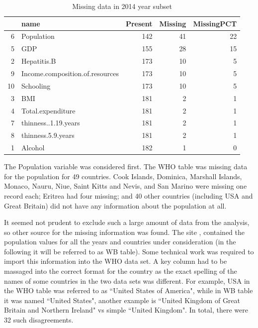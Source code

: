 \begin{table}[ht]
\centering
\begin{tabular}{rlrrr}
  \toprule
 & name & Present & Missing & MissingPCT \\ 
  \midrule
6 & Population & 142 &  41 &  22 \\ 
  5 & GDP & 155 &  28 &  15 \\ 
  2 & Hepatitis.B & 173 &  10 &   5 \\ 
  9 & Income.composition.of.resources & 173 &  10 &   5 \\ 
  10 & Schooling & 173 &  10 &   5 \\ 
  3 & BMI & 181 &   2 &   1 \\ 
  4 & Total.expenditure & 181 &   2 &   1 \\ 
  7 & thinness..1.19.years & 181 &   2 &   1 \\ 
  8 & thinness.5.9.years & 181 &   2 &   1 \\ 
  1 & Alcohol & 182 &   1 &   0 \\ 
   \bottomrule
\end{tabular}
\caption{Missing data in 2014 year subset}
\label{tab:missing}
\end{table}

The Population variable was considered first. The WHO table was missing data for the population for 49 countries. Cook Islands, Dominica, Marshall Islands, Monaco, Nauru, Niue, Saint Kitts and Nevis, and San Marino were missing one record each; Eritrea had four missing; and 40 other countries (including USA and Great Britain) did not have any information about the population at all.

It seemed not prudent to exclude such a large amount of data from the analysis, so other source for the missing information was found. The site \cite{WB}, contained the population values for all the years and countries under consideration (in the following it will be referred to as WB table). Some technical work was required to import this information into the WHO data set. A key column had to be massaged into the correct format for the country as the exact spelling of the names of some countries in the two data sets was different. For example, USA in the WHO table was referred to as ``United States of America", while in WB table it was named ``United States", another example is ``United Kingdom of Great Britain and Northern Ireland" vs simple ``United Kingdom".  In total, there were 32 such disagreements.


